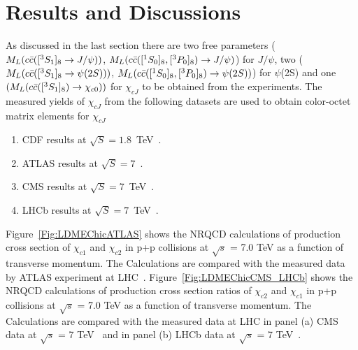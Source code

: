 \documentclass[aps,prc,preprint,superscriptaddress,showpacs,showkeys,amsmath]{revtex4-1}
\begin{document}

\section{Results and Discussions}
As discussed in the last section there are two free parameters ($M_{L}(c{\bar{c}}([^3S_1]_{8}\rightarrow J/\psi))$,
 $M_{L}(c{\bar{c}}([^1S_0]_{8},[^3P_0]_{8})\rightarrow J/\psi)$) for $J/\psi$, 
two ($M_{L}(c{\bar{c}}([^3S_1]_{8}\rightarrow \psi(2S)))$, $M_{L}(c{\bar{c}}([^1S_0]_{8},[^3P_0]_{8})\rightarrow \psi(2S))$)  
for $\psi$(2S) and one $(M_{L}(c{\bar{c}}([^3S_1]_{8})\rightarrow \chi_{c0}))$ for $\chi_{cJ}$ to be obtained 
from the experiments. 
The measured yields of $\chi_{cJ}$ from the following datasets
are used to obtain color-octet matrix elements for $\chi_{cJ}$ 
\begin{enumerate}
\item{CDF results at $\sqrt{S}=1.8$~TeV~\cite{Abe:1997yz}}.
\item{ATLAS results at $\sqrt{S}=7$~\cite{ATLAS:2014ala}}.
\item{CMS results at $\sqrt{S}=7$~TeV~\cite{Chatrchyan:2012ub}}.
\item{LHCb results at $\sqrt{S}=7$~TeV~\cite{Aaij:2013dja}}.
\end{enumerate}
Figure~\ref{Fig:LDMEChicATLAS} shows the NRQCD calculations of production cross section 
of  $\chi_{c1}$ and $\chi_{c2}$ in p+p collisions at $\sqrt{s}$ = 7.0 TeV as a function of 
transverse momentum. The Calculations are compared with the measured data by
ATLAS experiment at LHC~\cite{ATLAS:2014ala}. Figure~\ref{Fig:LDMEChicCMS_LHCb} shows
the NRQCD calculations of production cross section ratios 
of $\chi_{c2}$ and $\chi_{c1}$ in p+p collisions at
$\sqrt{s}$ = 7.0 TeV as a function of transverse momentum. 
The Calculations are compared with the measured data at
LHC in panel (a) CMS data at $\sqrt{s}$ = 7 TeV~\cite{Chatrchyan:2012ub}
and in panel (b) LHCb data at $\sqrt{s}$ = 7 TeV~\cite{Aaij:2013dja}.  
\end{document}
